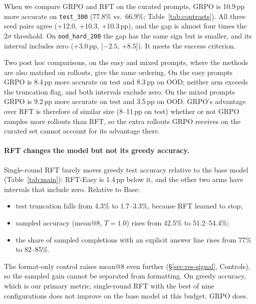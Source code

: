 \documentclass{article}
\begin{document}
When we compare GRPO and RFT on the curated prompts, GRPO is 10.9\,pp more accurate on \texttt{test\_300} (77.8\% vs.\ 66.9\%; Table~\ref{tab:contrasts}). All three seed pairs agree (+12.0, +10.3, +10.3\,pp), and the gap is almost four times the $2\sigma$ threshold. On \texttt{ood\_hard\_200} the gap has the same sign but is smaller, and its interval includes zero (+3.0\,pp, [$-2.5$, $+8.5$]). It meets the success criterion.

Two post hoc comparisons, on the easy and mixed prompts, where the methods are also matched on rollouts, give the same ordering. On the easy prompts GRPO is 8.4\,pp more accurate on test and 8.3\,pp on OOD; neither arm exceeds the truncation flag, and both intervals exclude zero. On the mixed prompts GRPO is 9.2\,pp more accurate on test and 3.5\,pp on OOD.  GRPO's advantage over RFT is therefore of similar size (8--11\,pp on test) whether or not GRPO samples more rollouts than RFT, so the extra rollouts GRPO receives on the curated set cannot account for its advantage there.

\paragraph{RFT changes the model but not its greedy accuracy.} Single-round RFT barely moves greedy test accuracy relative to the base model (Table~\ref{tab:main}): RFT-Easy is 1.4\,pp below it, and the other two arms have intervals that include zero. Relative to Base:
\begin{itemize}
  \item test truncation falls from 4.3\% to 1.7--3.3\%, because RFT learned to stop;
  \item sampled accuracy (mean@8, $T{=}1.0$) rises from 42.5\% to 51.2--54.4\%;
  \item the share of sampled completions with an explicit answer line rises from 77\% to 82--85\%.
\end{itemize}
The format-only control raises mean@8 even further (\S\ref{sec:res-signal}, Controls), so the sampled gain cannot be separated from formatting. On greedy accuracy, which is our primary metric, single-round RFT with the best of nine configurations does not improve on the base model at this budget. GRPO does.
\end{document}
